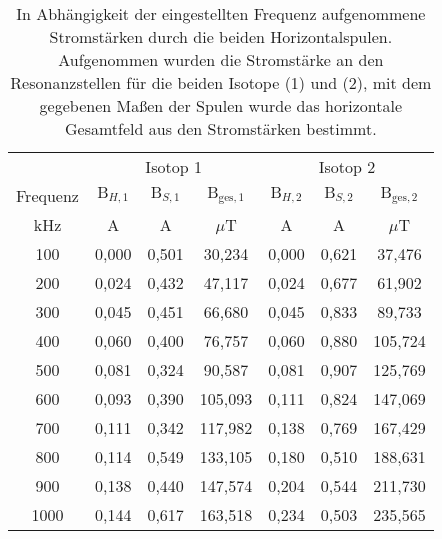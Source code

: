 \begin{table}
  \centering
  \caption{In Abhängigkeit der eingestellten Frequenz aufgenommene Stromstärken durch die beiden Horizontalspulen. Aufgenommen wurden die Stromstärke an den Resonanzstellen für die beiden Isotope (1) und (2), mit dem gegebenen Maßen der Spulen wurde das horizontale Gesamtfeld aus den Stromstärken bestimmt.}
  \label{tab:Tab1}
    \begin{tabular}{c | c c c | c c c}
      \toprule
       &    \multicolumn{3}{c}{Isotop 1} & \multicolumn{3}{c}{Isotop 2}\\
      Frequenz  & $\text{B}_{H,1}$ & $\text{B}_{S,1}$ & $\text{B}_{\text{ges},1}$  & $\text{B}_{H,2}$ & $\text{B}_{S,2}$ &  $\text{B}_{\text{ges},2}$\\
      kHz & A& A& $\mu$T & A& A& $\mu$T\\
      \midrule
      \midrule
      100     & 0,000  &  0,501 &  30,234  &  0,000 &  0,621 &  37,476 \\
      200     & 0,024  &  0,432 &  47,117  &  0,024 &  0,677 &  61,902 \\
      300     & 0,045  &  0,451 &  66,680  &  0,045 &  0,833 &  89,733 \\
      400     & 0,060  &  0,400 &  76,757  &  0,060 &  0,880 & 105,724 \\
      500     & 0,081  &  0,324 &  90,587  &  0,081 &  0,907 & 125,769 \\
      600     & 0,093  &  0,390 & 105,093  &  0,111 &  0,824 & 147,069 \\
      700     & 0,111  &  0,342 & 117,982  &  0,138 &  0,769 & 167,429 \\
      800     & 0,114  &  0,549 & 133,105  &  0,180 &  0,510 & 188,631 \\
      900     & 0,138  &  0,440 & 147,574  &  0,204 &  0,544 & 211,730 \\
      1000    & 0,144  &  0,617 & 163,518  &  0,234 &  0,503 & 235,565 \\
      \bottomrule
    \end{tabular}
\end{table}
